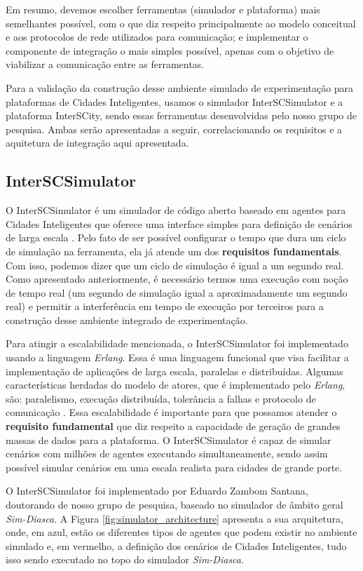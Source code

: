 Em resumo, devemos escolher ferramentas (simulador e plataforma) mais semelhantes possível, com o que diz respeito principalmente ao modelo conceitual e aos protocolos de
rede utilizados para comunicação; e implementar o componente de integração o mais simples possível, apenas com o objetivo de viabilizar a comunicação entre as ferramentas.

Para a validação da construção desse ambiente simulado de experimentação para plataformas de Cidades Inteligentes, usamos o simulador InterSCSimulator e a plataforma InterSCity,
sendo essas ferramentas desenvolvidas pelo nosso grupo de pesquisa. Ambas serão apresentadas a seguir, correlacionando os requisitos e a aquitetura de integração aqui
apresentada.

\subsection{InterSCSimulator}

O InterSCSimulator é um simulador de código aberto baseado em agentes para Cidades Inteligentes que oferece uma interface simples para definição de
cenários de larga escala \cite{santana_17}.
Pelo fato de ser possível configurar o tempo que dura um ciclo de simulação na ferramenta, ela já atende um dos \textbf{requisitos fundamentais}.
Com isso, podemos dizer que um ciclo de simulação é igual a um segundo real.
Como apresentado anteriormente, é necessário termos uma execução com noção de tempo real (um segundo de simulação igual a aproximadamente um segundo real) e permitir a
interferência em tempo de execução por terceiros para a construção desse ambiente integrado de experimentação.

Para atingir a escalabilidade mencionada, o InterSCSimulator foi implementado usando a linguagem \textit{Erlang}.
Essa é uma linguagem funcional que visa facilitar a implementação de aplicações de larga escala, paralelas e distribuídas.
Algumas características herdadas do modelo de atores, que é implementado pelo \textit{Erlang}, são: paralelismo, execução distribuída, tolerância a falhas e
protocolo de comunicação \cite{santana_17}.
Essa escalabilidade é importante para que possamos atender o \textbf{requisito fundamental} que diz respeito a capacidade de geração de grandes massas de dados
para a plataforma.
O InterSCSimulator é capaz de simular cenários com milhões de agentes executando simultaneamente, sendo assim possível simular cenários em uma escala realista para cidades de grande porte.

O InterSCSimulator foi implementado por Eduardo Zambom Santana, doutorando de nosso grupo de pesquisa, baseado no simulador de âmbito geral \textit{Sim-Diasca}.
A Figura \ref{fig:simulator_architecture} apresenta a sua arquitetura, onde, em azul, estão os diferentes tipos de agentes que podem existir no ambiente
simulado e, em vermelho, a definição dos cenários de Cidades Inteligentes, tudo isso sendo executado no topo do simulador \textit{Sim-Diasca}.

